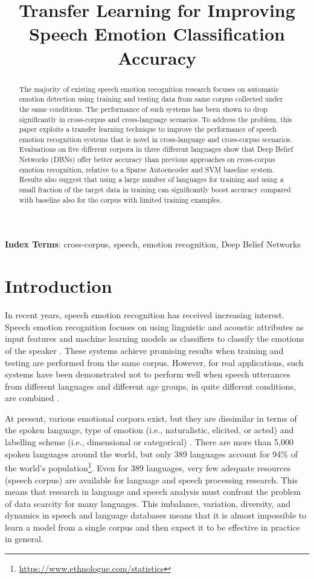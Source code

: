 \documentclass[a4paper]{article}
\title{Transfer Learning for Improving Speech Emotion Classification Accuracy}
\newcommand*{\JE}[1]{\textcolor{magenta}{#1}}
\begin{document}
\maketitle
% 
\begin{abstract}
 The majority of existing speech emotion recognition research focuses on automatic emotion detection using training and testing data from same corpus collected under the same conditions. The performance of such systems has been shown to drop significantly in cross-corpus and cross-language scenarios. To address the problem, this paper exploits a transfer learning technique to improve the performance of speech emotion recognition systems that is novel in cross-language and cross-corpus scenarios. Evaluations on five different corpora in three different languages show that Deep Belief Networks (DBNs) offer better accuracy than previous approaches on cross-corpus emotion recognition, relative to a Sparse Autoencoder and SVM baseline system. Results also suggest that using a large number of languages for training and using a small fraction of the target data in training can significantly boost accuracy compared with baseline also for the corpus with limited training examples. 
\end{abstract}
\noindent\textbf{Index Terms}: cross-corpus, speech, emotion recognition, Deep Belief Networks

\section{Introduction}
\label{sec:intro}


In recent years, speech emotion recognition has received increasing interest. Speech emotion recognition focuses on using linguistic and acoustic attributes as input features and machine learning models as classifiers to classify the emotions of the speaker \cite{batliner2011automatic}. These systems achieve promising results when training and testing are performed from the same corpus. However, for real applications, such systems have been demonstrated not to perform well when speech utterances from different languages and different age groups, in quite different conditions, are combined \cite{schuller2012synthesized}. 

At present, various emotional corpora exist, but they are dissimilar in terms of the spoken language, type of emotion (i.e., naturalistic, elicited, or acted) and labelling scheme (i.e., dimensional or categorical) \cite{schuller2010cross}. There are more than 5,000 spoken languages around the world, but only 389 languages account for 94\% of the world's population\footnote{\url{https://www.ethnologue.com/statistics}}. Even for 389 languages, very few adequate resources (speech corpus) are available for language and speech processing research. This means that research in language and speech analysis must confront the problem of data scarcity for many languages. This imbalance, variation,  diversity, and dynamics in speech and language databases means that it is almost impossible to learn a model from a single corpus and then expect it to be effective in practice in general. 
  
\end{document}
